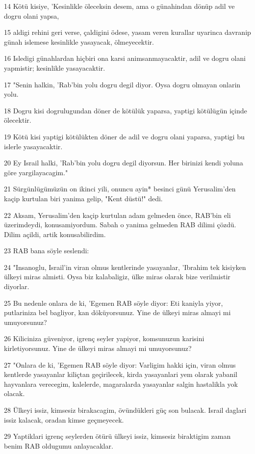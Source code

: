 \par 14 Kötü kisiye, 'Kesinlikle öleceksin desem, ama o günahindan dönüp adil ve dogru olani yapsa,
\par 15 aldigi rehini geri verse, çaldigini ödese, yasam veren kurallar uyarinca davranip günah islemese kesinlikle yasayacak, ölmeyecektir.
\par 16 Isledigi günahlardan hiçbiri ona karsi animsanmayacaktir, adil ve dogru olani yapmistir; kesinlikle yasayacaktir.
\par 17 "Senin halkin, 'Rab'bin yolu dogru degil diyor. Oysa dogru olmayan onlarin yolu.
\par 18 Dogru kisi dogrulugundan döner de kötülük yaparsa, yaptigi kötülügün içinde ölecektir.
\par 19 Kötü kisi yaptigi kötülükten döner de adil ve dogru olani yaparsa, yaptigi bu islerle yasayacaktir.
\par 20 Ey Israil halki, 'Rab'bin yolu dogru degil diyorsun. Her birinizi kendi yoluna göre yargilayacagim."
\par 21 Sürgünlügümüzün on ikinci yili, onuncu ayin* besinci günü Yerusalim'den kaçip kurtulan biri yanima gelip, "Kent düstü!" dedi.
\par 22 Aksam, Yerusalim'den kaçip kurtulan adam gelmeden önce, RAB'bin eli üzerimdeydi, konusamiyordum. Sabah o yanima gelmeden RAB dilimi çözdü. Dilim açildi, artik konusabilirdim.
\par 23 RAB bana söyle seslendi:
\par 24 "Insanoglu, Israil'in viran olmus kentlerinde yasayanlar, 'Ibrahim tek kisiyken ülkeyi miras almisti. Oysa biz kalabaligiz, ülke miras olarak bize verilmistir diyorlar.
\par 25 Bu nedenle onlara de ki, 'Egemen RAB söyle diyor: Eti kaniyla yiyor, putlariniza bel bagliyor, kan döküyorsunuz. Yine de ülkeyi miras almayi mi umuyorsunuz?
\par 26 Kiliciniza güveniyor, igrenç seyler yapiyor, komsunuzun karisini kirletiyorsunuz. Yine de ülkeyi miras almayi mi umuyorsunuz?
\par 27 "Onlara de ki, 'Egemen RAB söyle diyor: Varligim hakki için, viran olmus kentlerde yasayanlar kiliçtan geçirilecek, kirda yasayanlari yem olarak yabanil hayvanlara verecegim, kalelerde, magaralarda yasayanlar salgin hastalikla yok olacak.
\par 28 Ülkeyi issiz, kimsesiz birakacagim, övündükleri güç son bulacak. Israil daglari issiz kalacak, oradan kimse geçmeyecek.
\par 29 Yaptiklari igrenç seylerden ötürü ülkeyi issiz, kimsesiz biraktigim zaman benim RAB oldugumu anlayacaklar.
